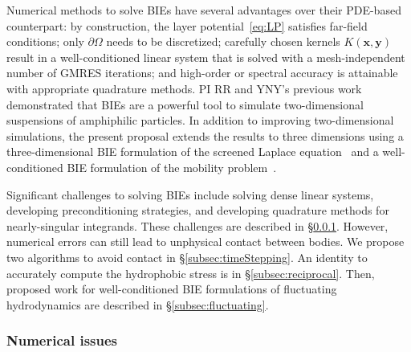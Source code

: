 Numerical methods to solve BIEs have several advantages over their
PDE-based counterpart: by construction, the layer
potential~\eqref{eq:LP} satisfies far-field conditions; only
$\partial\Omega$ needs to be discretized; carefully chosen kernels
$K(\mathbf{x},\mathbf{y})$ result in a well-conditioned linear system
that is solved with a mesh-independent number of GMRES iterations; and
high-order or spectral accuracy is attainable with appropriate
quadrature methods. PI RR and YNY's previous work~\cite{Fu2018_SIAM}
demonstrated that BIEs are a powerful tool to simulate two-dimensional
suspensions of amphiphilic particles. In addition to improving
two-dimensional simulations, the present proposal extends the results to three
dimensions using a three-dimensional BIE formulation of the
screened Laplace equation~\cite{ying_2006} and a well-conditioned BIE
formulation of the mobility problem~\cite{manasthesis, rac-gre2016}.

Significant challenges to solving BIEs include solving dense linear
systems, developing preconditioning strategies, and developing
quadrature methods for nearly-singular integrands. These
challenges are described in \S\ref{subsec:NumericalIssues}. However,
numerical errors can still lead to unphysical contact between bodies. We
propose two algorithms to avoid contact in \S\ref{subsec:timeStepping}.
An identity to accurately compute the hydrophobic stress is in
\S\ref{subsec:reciprocal}. Then, proposed work for well-conditioned BIE
formulations of fluctuating hydrodynamics are described in
\S\ref{subsec:fluctuating}.



\subsubsection{Numerical issues}
\label{subsec:NumericalIssues}

